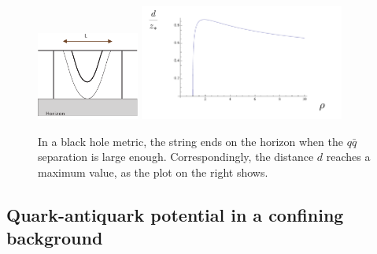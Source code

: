 \documentclass[12pt,notitlepage,a4paper]{article}
\begin{document}
\begin{figure}[ht]
\center
\includegraphics[width=0.30\textwidth]{WilsonBH.pdf}
\qquad
\includegraphics[width=0.60\textwidth]{dWL_finiteT.pdf}
\caption{In a black hole metric, the string ends on the horizon when the $q\bar q$ separation is large enough. Correspondingly, the distance $d$ reaches a maximum value, as the plot on the right shows.  } 
\label{Wilson_finiteT}
\end{figure}


\subsection{Quark-antiquark potential in a confining background}
\end{document}
